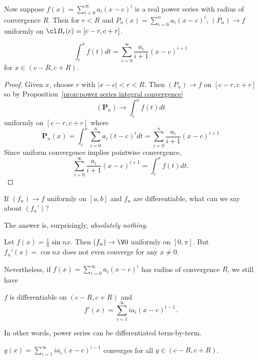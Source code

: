 \documentclass[a4paper]{article}
\theoremstyle{definition}
\begin{document}
Now suppose \(f(x) = \sum_{i=0}^{\infty}a_i(x-c)^i \) is a real power series with radius of convergence \(R\). Then for \(r< R\) and \(P_n(x) = \sum_{i=0}^{n}a_i(x-c)^i \), \((P_n)\to f\) uniformly on \(\cl B_r(c) = [c-r,c+r]\).

\begin{corollary}
  \[
    \int_{c}^{x} f(t) dt = \sum_{i=0}^{\infty}\frac{a_i}{i+1}(x-c)^{i+1}
  \]
  for \(x\in (c-R,c+R)\).
\end{corollary}

\begin{proof}
  Given \(x\), choose \(r\) with \(|x-c| < r < R\). Then \((P_n)\to f\) on \([c-r, c+r]\) so by Proposition~\ref{prop:power series integral convergence}
  \[
    (\mathbf{P}_n) \to \int_{c}^{x} f(t) dt
  \]
  uniformly on \([c-r, c+r]\) where
  \[
    \mathbf{P}_n(x) = \int_{c}^{x} \sum_{i=0}^{n}a_i(t-c)^i dt = \sum_{i=0}^{n} \frac{a_i}{i+1} (x-c)^{i+1}
  \]
  Since uniform convergence implies pointwise convergence,
  \[
    \sum_{i=0}^{\infty}\frac{a_i}{i+1}(x-c)^{i+1} = \int_{c}^{x} f(t) dt.
  \]
\end{proof}

\begin{question}
  If \((f_n)\to f\) uniformly on \([a,b]\) and \(f_n\) are differentiable, what can we say about \((f_n')\)?
\end{question}

The answer is, surprisingly, \emph{absolutely nothing}.

\begin{eg}
  Let \(f(x) = \frac{1}{n}\sin nx\). Then \((f_n)\to \V 0\) uniformly on \([0,\pi]\). But \(f_n'(x) = \cos nx\) does not even converge for any \(x\neq 0\).
\end{eg}

Nevertheless, if \(f(x) = \sum_{i=0}^{\infty}a_i(x-c)^i \) has radius of convergence \(R\), we still have

\begin{proposition}
  \(f\) is differentiable on \((c-R, c+R)\) and
  \[
    f'(x) = \sum_{i=1}^{\infty}i a_i(x-c)^{i-1}. 
  \]
\end{proposition}

In other words, power series can be differentiated term-by-term.

\begin{lemma}
  \(g(x) = \sum_{i=1}^{\infty}i a_i(x-c)^{i-1} \) converges for all \(y\in(c-R,c+R)\).
\end{lemma}
\end{document}
